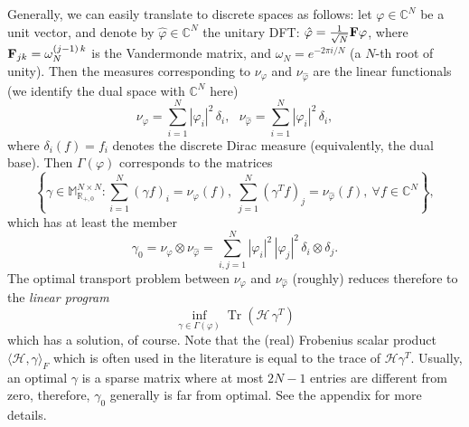 \documentclass[12pt,a4paper]{article}
\newcommand{\CC}[1]{\mathbb{C}^#1}
\newcommand{\HH}{\mathcal{H}}
\begin{document}
Generally, we can easily translate to discrete spaces as follows: let 
$\varphi\in {\CC N}$ be a unit vector, and denote by $\hat\varphi\in {\CC N}$
the unitary DFT: $\hat\varphi = \frac{1}{\sqrt{N}} {\bf F} \varphi$, where
${\bf F}_{jk}=\omega_N^{(j-1)\,k}$ is the Vandermonde matrix, and 
$\omega_N = e^{-2\pi i/N}$ (a $N$-th root of unity). Then the measures
corresponding to $\nu_\varphi$ and $\nu_{\hat\varphi}$ are the linear
functionals (we identify the dual space with $\CC N$ here)
\begin{equation}
     \nu_\varphi = \sum_{i=1}^N |\varphi_i|^2\,\delta_i,\ \ \ 
     \nu_{\hat\varphi} = \sum_{i=1}^N |\hat\varphi_i|^2\,\delta_i,
\end{equation}
where $\delta_i(f)=f_i$ denotes the discrete Dirac measure (equivalently, the
dual base). Then $\Gamma(\varphi)$ corresponds to the matrices 
\begin{displaymath}
  \left\{ \gamma\in \mathbb{M}_{\mathbb{R}_{+,0}}^{N\times N}: 
    \sum_{i=1}^N(\gamma f)_i=\nu_{\varphi}(f),\ 
     \sum_{j=1}^N(\gamma^T f)_j=\nu_{\hat\varphi}(f),\ 
     \forall f\in {\CC N} \right\},
\end{displaymath}
which has at least the member
\begin{displaymath}
    \gamma_0=\nu_{\varphi}\otimes\nu_{\hat\varphi}=
     \sum_{i,j=1}^N |\varphi_i|^2\,|\hat\varphi_j|^2\,\delta_i\otimes \delta_j.
\end{displaymath}
The optimal transport problem between $\nu_\varphi$ and $\nu_{\hat\varphi}$ 
(roughly) reduces therefore to the {\sl linear program}
\begin{equation}
     \inf_{\gamma\in\Gamma(\varphi)} \operatorname{Tr}({\HH}\,\gamma^T)
\end{equation}
which has a solution, of course. Note that the (real) Frobenius scalar product 
$\langle \HH,\gamma\rangle_F$ which is often used in the literature is equal to 
the trace of $\HH \gamma^T$. Usually, an optimal $\gamma$ is a sparse matrix 
where at most $2N-1$ entries are different from zero, therefore, $\gamma_0$
generally is far from optimal. See the appendix for more details. 
%
%
\newpage
\end{document}
